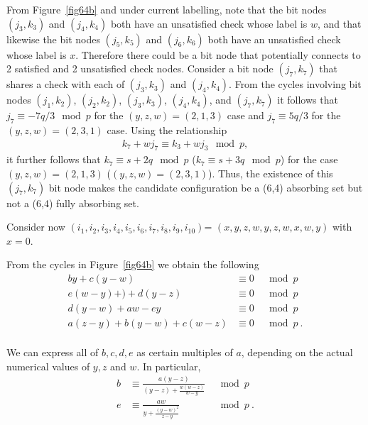 {From Figure~\ref{fig64b} and under current labelling, note that
the bit nodes $(j_3,k_3)$ and $(j_4,k_4)$ both have an unsatisfied
check whose label is $w$, and that likewise the bit nodes
$(j_5,k_5)$ and $(j_6,k_6)$ both have an unsatisfied check whose
label is $x$. Therefore there could be a bit node that potentially
connects to 2 satisfied and 2 unsatisfied check nodes. Consider a
bit node $(j_7,k_7)$ that shares a check with each of $(j_3,k_3)$
and $(j_4,k_4)$. From the cycles involving bit nodes $(j_1,k_2)$,
$(j_2,k_2)$, $(j_3,k_3)$, $(j_4,k_4)$, and $(j_7,k_7)$ it follows
that $j_7 \equiv -7q/3 \mod p$ for the $(y,z,w)=(2,1,3)$ case and
$j_7 \equiv 5q/3$ for the $(y,z,w)=(2,3,1)$ case. Using the
relationship
\begin{eqnarray*}
k_7 +wj_7 \equiv k_3+wj_3 \mod p,
\end{eqnarray*}
it further follows that $k_7 \equiv s+2q \mod p$  ($k_7 \equiv
s+3q \mod p$) for the case $(y,z,w)=(2,1,3)$ ($(y,z,w)=(2,3,1)$).
Thus, the existence of this $(j_7,k_7)$ bit node makes the
candidate configuration be a (6,4) absorbing set but not a (6,4)
fully absorbing set.




Consider now $(i_1,i_2,i_3,i_4,i_5,i_6,i_7,i_8,i_9,i_{10})$=
$(x,y,z,w,y,z,w,x,w,y)$ with $x=0$.  

From the cycles in Figure~\ref{fig64b} we obtain the following
\begin{equation}\label{sys33}\begin{array}{cccc}
 by+c(y-w) &\equiv 0 &\mod p\\
 e(w-y)+)+d(y-z) &\equiv 0 &\mod p\\
 d(y-w)+aw-ey &\equiv 0 &\mod p\\
 a(z-y)+b(y-w)+c(w-z) &\equiv 0 &\mod p~.\\
 \end{array}\end{equation}

We can express all of $b,c,d,e$ as certain multiples of
 $a$, depending on the actual numerical values of $y,z$ and $w$.
 In particular,
 \begin{eqnarray}\label{eq34a}
 b &\equiv  \frac{a(y-z) }{(y-z)+\frac{w(w-z)}{w-y}} &\mod p\\
 \label{eq34aa}e &\equiv  \frac{aw}{y+\frac{(y-w)^2}{z-y}} &\mod p~.
 \end{eqnarray}

}
